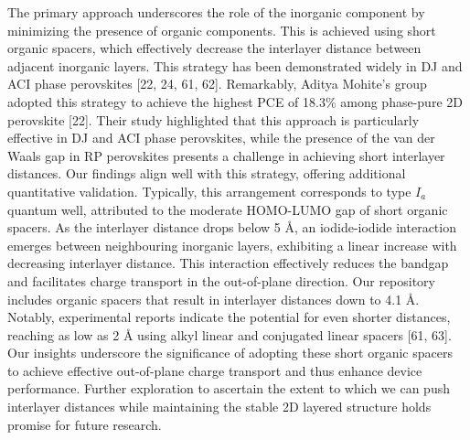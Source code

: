 The primary approach underscores the role of the inorganic component by minimizing the presence of organic components. This is achieved using short organic spacers, which effectively decrease the interlayer distance between adjacent inorganic layers. This strategy has been demonstrated widely in DJ and ACI phase perovskites [22, 24, 61, 62]. Remarkably, Aditya Mohite’s group adopted this strategy to achieve the highest PCE of 18.3\% among phase-pure 2D perovskite [22]. Their study highlighted that this approach is particularly effective in DJ and ACI phase perovskites, while the presence of the van der Waals gap in RP perovskites presents a challenge in achieving short interlayer distances. Our findings align well with this strategy, offering additional quantitative validation. Typically, this arrangement corresponds to type $I_a$ quantum well, attributed to the moderate HOMO-LUMO gap of short organic spacers. As the interlayer distance drops below 5 Å, an iodide-iodide interaction emerges between neighbouring inorganic layers, exhibiting a linear increase with decreasing interlayer distance. This interaction effectively reduces the bandgap and facilitates charge transport in the out-of-plane direction. Our repository includes organic spacers that result in interlayer distances down to 4.1 {\AA}. Notably, experimental reports indicate the potential for even shorter distances, reaching as low as 2 Å using alkyl linear and conjugated linear spacers [61, 63]. Our insights underscore the significance of adopting these short organic spacers to achieve effective out-of-plane charge transport and thus enhance device performance. Further exploration to ascertain the extent to which we can push interlayer distances while maintaining the stable 2D layered structure holds promise for future research. 

